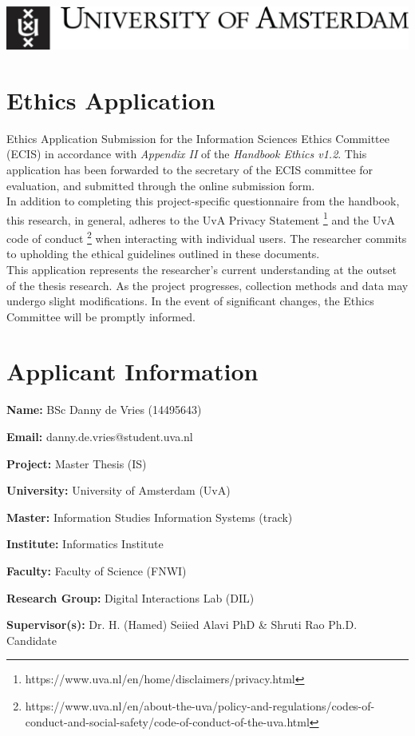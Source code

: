 \documentclass[a4paper]{article}
\begin{document}
\includegraphics[scale=0.2]{uva-logo.jpg} \\

\section*{Ethics Application}

Ethics Application Submission for the Information Sciences Ethics Committee (ECIS) in accordance with \emph{Appendix II} of the \emph{Handbook Ethics v1.2}. This application has been forwarded to the secretary of the ECIS committee for evaluation, and submitted through the online submission form. \\

In addition to completing this project-specific questionnaire from the handbook, this research, in general, adheres to the UvA Privacy Statement \footnote{https://www.uva.nl/en/home/disclaimers/privacy.html} and the UvA code of conduct \footnote{https://www.uva.nl/en/about-the-uva/policy-and-regulations/codes-of-conduct-and-social-safety/code-of-conduct-of-the-uva.html} when interacting with individual users. The researcher commits to upholding the ethical guidelines outlined in these documents. \\

This application represents the researcher's current understanding at the outset of the thesis research. As the project progresses, collection methods and data may undergo slight modifications. In the event of significant changes, the Ethics Committee will be promptly informed.


\section*{Applicant Information}

\begin{description}
  \item \textbf{Name:} BSc Danny de Vries (14495643)
  \item \textbf{Email:} danny.de.vries@student.uva.nl
  \item \textbf{Project:} Master Thesis (IS)
  \item \textbf{University:} University of Amsterdam (UvA)
  \item \textbf{Master:} Information Studies Information Systems (track)
  \item \textbf{Institute:} Informatics Institute
  \item \textbf{Faculty:} Faculty of Science (FNWI)
  \item \textbf{Research Group:} Digital Interactions Lab (DIL)
  \item \textbf{Supervisor(s):} Dr. H. (Hamed) Seiied Alavi PhD \& Shruti Rao Ph.D. Candidate
\end{description}
\end{document}
